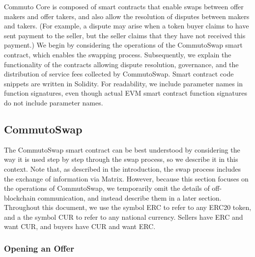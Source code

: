 \documentclass[11pt]{article}
\begin{document}
    Commuto Core is composed of smart contracts that enable swaps between offer makers and offer
    takers, and also allow the resolution of disputes between makers and takers.
    (For example, a dispute may arise when a token buyer claims to have sent payment to the seller,
    but the seller claims that they have not received this payment.)
    We begin by considering the operations of the CommutoSwap smart contract, which enables the
    swapping process.
    Subsequently, we explain the functionality of the contracts allowing dispute resolution,
    governance, and the distribution of service fees collected by CommutoSwap.
    Smart contract code snippets are written in Solidity\cite{Solidity}.
    For readability, we include parameter names in function signatures, even though actual EVM smart
    contract function signatures do not include parameter names.

    \subsection*{CommutoSwap}

    The CommutoSwap smart contract can be best understood by considering the way it is used step by
    step through the swap process, so we describe it in this context.
    Note that, as described in the introduction, the swap process includes the exchange of
    information via Matrix.
    However, because this section focuses on the operations of CommutoSwap, we temporarily omit the
    details of off-blockchain communication, and instead describe them in a later section.
    Throughout this document, we use the symbol ERC to refer to any ERC20 token, and a the symbol
    CUR to refer to any national currency.
    Sellers have ERC and want CUR, and buyers have CUR and want ERC.

    \subsubsection*{Opening an Offer}
\end{document}
